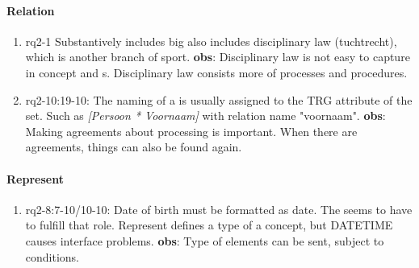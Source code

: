 \paragraph{Relation}
\begin{enumerate}
    \item rq2-1 Substantively includes \acrshort{big} also includes disciplinary law (tuchtrecht), which is another branch of sport.
    \newline\textbf{obs}: Disciplinary law is not easy to capture in {concept} and s.
    Disciplinary law consists more of processes and procedures.

    \item rq2-10:19-10: The naming of a  is usually assigned to the TRG attribute of the set.
    Such as \textit{[Persoon * Voornaam]} with relation name "voornaam".
    \newline\textbf{obs}: Making agreements about processing is important.
    When there are agreements, things can also be found again.

\end{enumerate}

\paragraph{Represent}
\begin{enumerate}
    \item rq2-8:7-10/10-10: Date of birth must be formatted as date.
    The  seems to have to fulfill that role.
    Represent defines a type of a concept, but DATETIME causes interface problems.
    \newline\textbf{obs}: Type of elements can be sent, subject to conditions.

\end{enumerate}

